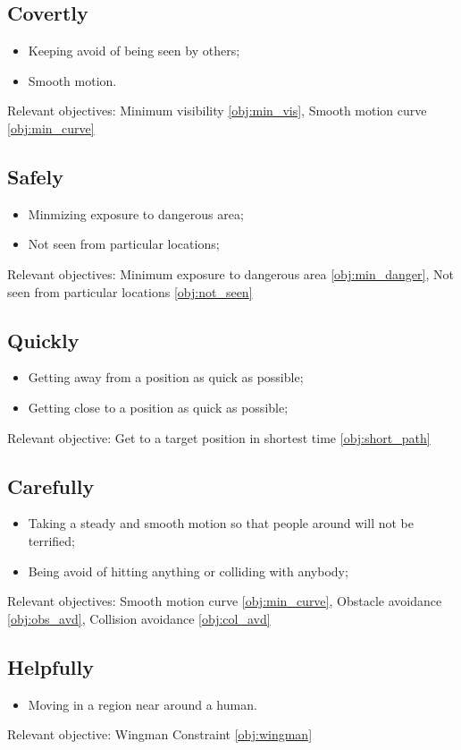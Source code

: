 \documentclass[12pt]{article}
\begin{document}
\subsection{Covertly}
\begin{itemize}
\item Keeping avoid of being seen by others;
\item Smooth motion.
\end{itemize}
Relevant objectives:
Minimum visibility \ref{obj:min_vis}, Smooth motion curve \ref{obj:min_curve}

\subsection{Safely}
\begin{itemize}
\item Minmizing exposure to dangerous area;
\item Not seen from particular locations;
\end{itemize}
Relevant objectives:
Minimum exposure to dangerous area \ref{obj:min_danger}, Not seen from particular locations \ref{obj:not_seen}

\subsection{Quickly}
\begin{itemize}
\item Getting away from a position as quick as possible;
\item Getting close to a position as quick as possible;
\end{itemize}
Relevant objective:
Get to a target position in shortest time \ref{obj:short_path}

\subsection{Carefully} 
\begin{itemize}
\item Taking a steady and smooth motion so that people around will not be terrified; 
\item Being avoid of hitting anything or colliding with anybody;
\end{itemize}
Relevant objectives:
Smooth motion curve \ref{obj:min_curve}, Obstacle avoidance \ref{obj:obs_avd}, Collision avoidance \ref{obj:col_avd}

\subsection{Helpfully}
\begin{itemize}
\item Moving in a region near around a human.
\end{itemize}
Relevant objective:
Wingman Constraint \ref{obj:wingman}
\end{document}

